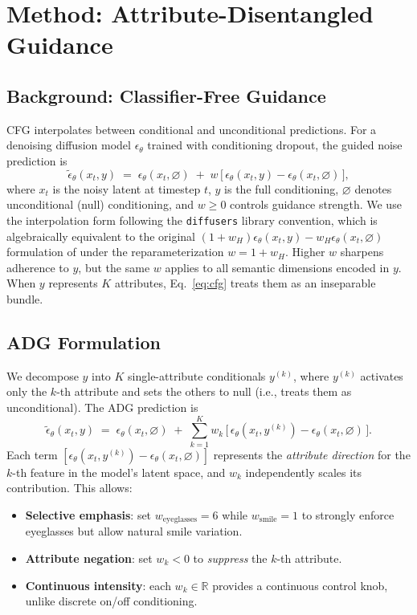 \documentclass{article}
\begin{document}
\section{Method: Attribute-Disentangled Guidance}
\label{sec:method}

\subsection{Background: Classifier-Free Guidance}

CFG interpolates between conditional and unconditional predictions. For a denoising diffusion model $\epsilon_\theta$ trained with conditioning dropout, the guided noise prediction is
\begin{equation}
\tilde{\epsilon}_\theta(x_t, y) \;=\; \epsilon_\theta(x_t, \varnothing) \;+\; w\,\bigl[\,\epsilon_\theta(x_t, y) - \epsilon_\theta(x_t, \varnothing)\,\bigr],
\label{eq:cfg}
\end{equation}
where $x_t$ is the noisy latent at timestep $t$, $y$ is the full conditioning, $\varnothing$ denotes unconditional (null) conditioning, and $w \geq 0$ controls guidance strength. We use the interpolation form following the \texttt{diffusers} library convention, which is algebraically equivalent to the original $(1+w_H)\epsilon_\theta(x_t,y) - w_H\epsilon_\theta(x_t,\varnothing)$ formulation of \citet{ho2022cfg} under the reparameterization $w = 1 + w_H$. Higher $w$ sharpens adherence to $y$, but the same $w$ applies to all semantic dimensions encoded in $y$. When $y$ represents $K$ attributes, Eq.~\eqref{eq:cfg} treats them as an inseparable bundle.

\subsection{ADG Formulation}

We decompose $y$ into $K$ single-attribute conditionals $y^{(k)}$, where $y^{(k)}$ activates only the $k$-th attribute and sets the others to null (i.e., treats them as unconditional). The ADG prediction is
\begin{equation}
\tilde{\epsilon}_\theta(x_t, y) \;=\; \epsilon_\theta(x_t, \varnothing) \;+\; \sum_{k=1}^K w_k \,\bigl[\,\epsilon_\theta(x_t, y^{(k)}) - \epsilon_\theta(x_t, \varnothing)\,\bigr].
\label{eq:adg}
\end{equation}
Each term $[\epsilon_\theta(x_t, y^{(k)}) - \epsilon_\theta(x_t, \varnothing)]$ represents the \emph{attribute direction} for the $k$-th feature in the model's latent space, and $w_k$ independently scales its contribution. This allows:
\begin{itemize}
\item \textbf{Selective emphasis}: set $w_{\text{eyeglasses}} = 6$ while $w_{\text{smile}} = 1$ to strongly enforce eyeglasses but allow natural smile variation.
\item \textbf{Attribute negation}: set $w_k < 0$ to \emph{suppress} the $k$-th attribute.
\item \textbf{Continuous intensity}: each $w_k \in \mathbb{R}$ provides a continuous control knob, unlike discrete on/off conditioning.
\end{itemize}
\end{document}
